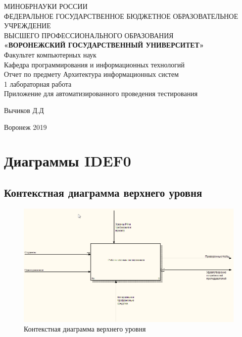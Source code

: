 \documentclass{article}
\begin{document}
    \begin{center}
    \hfill \break
    \large{МИНОБРНАУКИ РОССИИ}\\
    \footnotesize{ФЕДЕРАЛЬНОЕ ГОСУДАРСТВЕННОЕ БЮДЖЕТНОЕ ОБРАЗОВАТЕЛЬНОЕ УЧРЕЖДЕНИЕ}\\
    \footnotesize{ВЫСШЕГО ПРОФЕССИОНАЛЬНОГО ОБРАЗОВАНИЯ}\\
    \small{\textbf{«ВОРОНЕЖСКИЙ ГОСУДАРСТВЕННЫЙ УНИВЕРСИТЕТ»}}\\
    \hfill \break
    \normalsize{Факультет компьютерных наук}\\
    \hfill \break
    \normalsize{Кафедра программирования и информационных технологий}\\
    \hfill\break
    \hfill \break
    \hfill \break
    \hfill \break
    \large{Отчет по предмету Архитектура информационных систем
    \\1 лабораторная работа
    \\Приложение для автоматизированного проведения тестирования}\\
    \end{center}

    \hfill \break
    \hfill \break
    \hfill \break
    \hfill \break
    \hfill \break

    \begin{flushright} Вычиков Д.Д \end{flushright}
    \vspace*{\fill}
    \begin{center} Воронеж 2019 \end{center}
    \thispagestyle{empty}
    \newpage

    \section{Диаграммы IDEF0}
    \subsection{Контекстная диаграмма верхнего уровня}
    \begin{figure}[H]
        \includegraphics[width=\textwidth, center]{../img/idef0/idef0_context.png}
        \caption{Контекстная диаграмма верхнего уровня}
    \end{figure}
\end{document}
